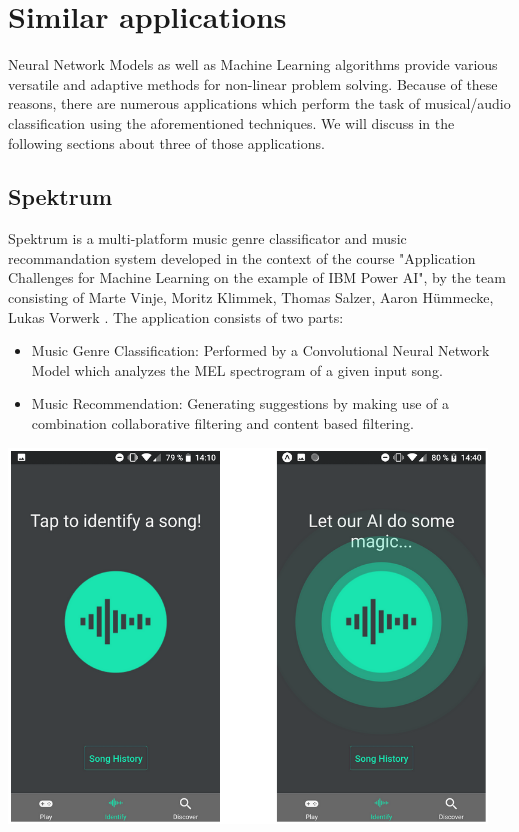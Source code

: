 \chapter{Similar applications}

Neural Network Models as well as Machine Learning algorithms provide various versatile and adaptive methods for non-linear problem solving. Because of these reasons, there are numerous applications which perform the task of musical/audio classification using the aforementioned techniques. We will discuss in the following sections about three of those applications.

\section{Spektrum}

Spektrum is a multi-platform music genre classificator and music recommandation system developed in the context of the course "Application Challenges for
Machine Learning on the example of IBM Power AI", by the team consisting of Marte Vinje, Moritz Klimmek, Thomas Salzer, Aaron Hümmecke, Lukas Vorwerk \cite{spektrum} . The application consists of two parts:
\begin{itemize}
	\item Music Genre Classification: Performed by a Convolutional Neural Network Model which analyzes the MEL spectrogram of a given input song.
	\item Music Recommendation: Generating suggestions by making use of a combination collaborative filtering
		and content based filtering.
\end{itemize}

\begin{center}
	\centering
	\includegraphics[width = 5.0in]{images/spektrum.png}
	\centerline{}
\label{spektrum}
\end{center}


